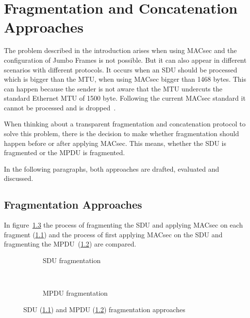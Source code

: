 \chapter{Fragmentation and Concatenation Approaches}
\label{ch:design}
The problem described in the introduction arises when using \gls{MACsec} and the configuration of Jumbo Frames is not possible.
But it can also appear in different scenarios with different protocols.
It occurs when an \gls{SDU} should be processed which is bigger than the \gls{MTU}, when using \gls{MACsec} bigger than 1468 bytes.
This can happen because the sender is not aware that the \gls{MTU} undercuts the standard Ethernet \gls{MTU} of 1500 byte.
Following the current \gls{MACsec} standard it cannot be processed and is dropped~\cite{macsec}.

When thinking about a transparent fragmentation and concatenation protocol to solve this problem, there is the decision to make whether fragmentation should happen before or after applying \gls{MACsec}.
This means, whether the \gls{SDU} is fragmented or the \gls{MPDU} is fragmented.

In the following paragraphs, both approaches are drafted, evaluated and discussed.

\section{Fragmentation Approaches}
In figure~\ref{fig:sdu-mpdu-frag} the process of fragmenting the \gls{SDU} and applying \gls{MACsec} on  each fragment (\ref{fig:sdu-frag}) and the process of first applying \gls{MACsec} on the \gls{SDU} and fragmenting the \gls{MPDU}~(\ref{fig:mpdu-frag}) are compared.

\begin{figure}
  \begin{subfigure}{0.53\textwidth}
    \centering
    \def\svgwidth{\columnwidth}
    
    \caption{SDU fragmentation}
    \label{fig:sdu-frag}
  \end{subfigure}
  ~
  \begin{subfigure}{0.45\textwidth}
    \centering
    \def\svgwidth{\columnwidth}
    
    \caption{MPDU fragmentation}
    \label{fig:mpdu-frag}
  \end{subfigure}
  \caption[\acrshort{SDU} and \acrshort{MPDU} approaches]{SDU (\ref{fig:sdu-frag}) and MPDU (\ref{fig:mpdu-frag}) fragmentation approaches}
  \label{fig:sdu-mpdu-frag}
\end{figure}


